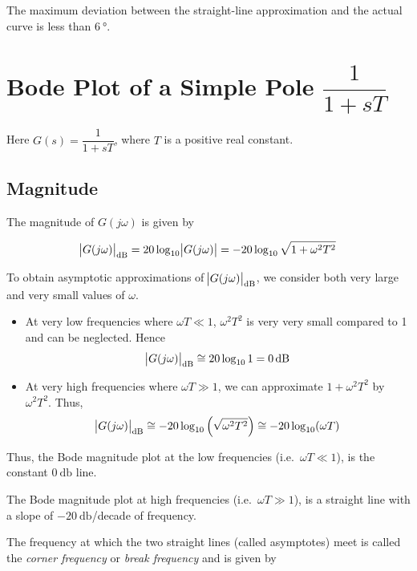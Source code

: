 \documentclass[
  14pt,
  a4paper,
  oneside,
  open=any,
  a4paper,
  14pt]{report}
\providecommand{\tightlist}{%
  \setlength{\itemsep}{0pt}\setlength{\parskip}{0pt}}\usepackage{longtable,booktabs,array}
\begin{document}
The maximum deviation between the straight-line approximation and the
actual curve is less than \(\SI{6}{\degree}\).

\newpage{}

\section{\texorpdfstring{Bode Plot of a Simple Pole
\(\dfrac{1}{1+sT}\)}{Bode Plot of a Simple Pole \textbackslash dfrac\{1\}\{1+sT\}}}\label{bode-plot-of-a-simple-pole-dfrac11st}

Here \(G(s) = \dfrac{1}{1+sT}\), where \(T\) is a positive real
constant.

\subsection{Magnitude}\label{magnitude-1}

The magnitude of \(G(j\omega)\) is given by

\[
\abs{G(j\omega)}_{\unit{\decibel}} = 20\log_{10}\abs{G(j\omega)} = -20\log_{10}\sqrt{1+\omega^2 T^2}
\]

To obtain asymptotic approximations of
\(\abs{G(j\omega)}_{\unit{\decibel}}\), we consider both very large and
very small values of \(\omega\).

\begin{itemize}
\tightlist
\item
  At very low frequencies where \(\omega T \ll 1\), \(\omega^2 T^2\) is
  very very small compared to 1 and can be neglected. Hence\\
  \[
  \abs{G(j\omega)}_{\unit{\decibel}} \cong 20\log_{10} 1 = \SI{0}{\decibel}
  \]
\item
  At very high frequencies where \(\omega T \gg 1\), we can approximate
  \(1+\omega^2 T^2\) by \(\omega^2 T^2\). Thus,\\
  \[
  \abs{G(j\omega)}_{\unit{\decibel}} \cong -20\log_{10} \left(\sqrt{\omega^2 T^2} \right) \cong -20\log_{10}(\omega T)
  \]
\end{itemize}

Thus, the Bode magnitude plot at the low frequencies
(i.e.~\(\omega T \ll 1\)), is the constant \(\SI{0}{\decibel}\) line.

The Bode magnitude plot at high frequencies (i.e.~\(\omega T \gg 1\)),
is a straight line with a slope of \(\SI{-20}{\decibel}\)/decade of
frequency.

The frequency at which the two straight lines (called asymptotes) meet
is called the \emph{corner frequency} or \emph{break frequency} and is
given by
\end{document}
